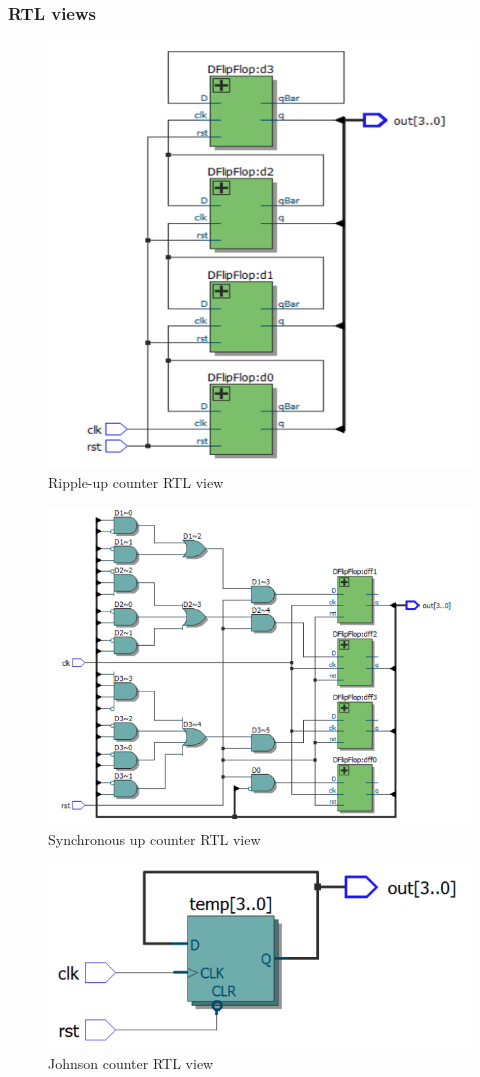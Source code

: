 \documentclass{article}
\begin{document}
	\subsubsection{RTL views}
		\begin{figure}[H]
		  \centering
		  \includegraphics[width=0.75\linewidth]{figures/RTLs/rippleUp_RTL.png}
		  \caption{Ripple-up counter RTL view}
		  \label{fig:rippleUp_RTL}
		\end{figure}
		  
		\begin{figure}[H]
		  \centering
		  \includegraphics[width=0.75\linewidth]{figures/RTLs/synUp_RTL.png}
		  \caption{Synchronous up counter RTL view}
		  \label{fig:synUp_RTL}
		\end{figure}

		\begin{figure}[H]
		  \centering
		  \includegraphics[width=0.75\linewidth]{figures/RTLs/johnson_RTL.png}
		  \caption{Johnson counter RTL view}
		  \label{fig:johnson_RTL}
		\end{figure}
\end{document}
